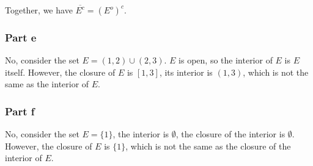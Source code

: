 Together, we have $ \overline{E^c} = (E^o)^c $.

\subsubsection*{Part e}
No, consider the set $ E = (1, 2) \cup (2, 3) $. $ E $ is open, so the interior of $ E $ is $ E $ itself. However, the closure of $ E $ is $ [1, 3] $, its interior is $ (1, 3) $, which is not the same as the interior of $ E $.

\subsubsection*{Part f}
No, consider the set $ E = \{1\} $, the interior is $ \emptyset $, the closure of the interior is $ \emptyset $. However, the closure of $ E $ is $ \{1\} $, which is not the same as the closure of the interior of $ E $.